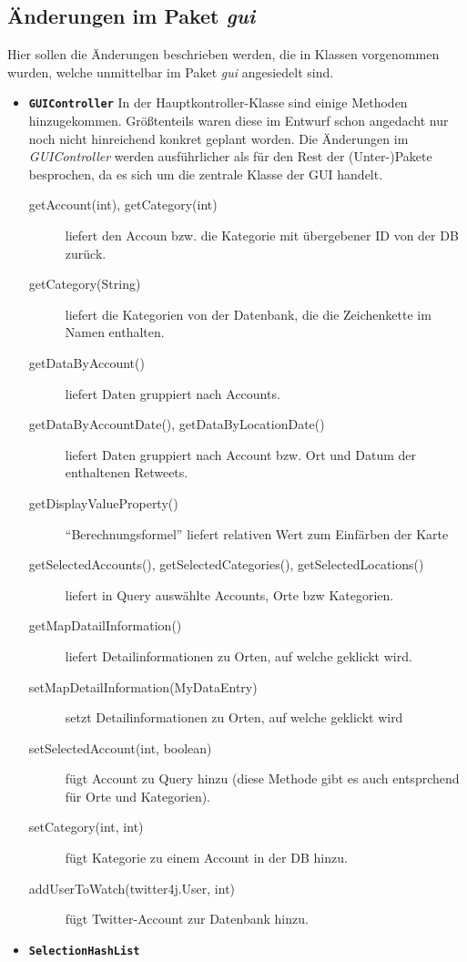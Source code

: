 \subsection{Änderungen im Paket \emph{gui}}
Hier sollen die Änderungen beschrieben werden, die in Klassen vorgenommen wurden, welche unmittelbar im Paket \emph{gui} angesiedelt sind.
\begin{itemize}
	\item \textbf{\lstinline{GUIController}}
	\quad 
	In der Hauptkontroller-Klasse sind einige Methoden hinzugekommen. Größtenteils waren diese im Entwurf schon angedacht nur noch nicht hinreichend konkret geplant worden. Die Änderungen im \emph{GUIController} werden ausführlicher als für den Rest der (Unter-)Pakete besprochen, da es sich um die zentrale Klasse der GUI handelt.
	\begin{description}
		\item[getAccount(int), getCategory(int)] liefert den Accoun bzw. die Kategorie mit übergebener ID von der DB zurück.
		\item[getCategory(String)] liefert die Kategorien von der Datenbank, die die Zeichenkette im Namen enthalten.
		\item[getDataByAccount()] liefert Daten gruppiert nach Accounts.
		\item[getDataByAccountDate(), getDataByLocationDate()] liefert Daten gruppiert nach Account bzw. Ort und Datum der enthaltenen Retweets.
		\item[getDisplayValueProperty()] "`Berechnungsformel"' liefert relativen Wert zum Einfärben der Karte
		\item[getSelectedAccounts(), getSelectedCategories(), getSelectedLocations()] liefert in Query auswählte Accounts, Orte bzw Kategorien.
		\item[getMapDatailInformation()] liefert Detailinformationen zu Orten, auf welche geklickt wird.
		\item[setMapDetailInformation(MyDataEntry)] setzt Detailinformationen zu Orten, auf welche geklickt wird
		\item[setSelectedAccount(int, boolean)] fügt Account zu Query hinzu (diese Methode gibt es auch entsprchend für Orte und Kategorien).
		\item[setCategory(int, int)] fügt Kategorie zu einem Account in der DB hinzu.
		\item[addUserToWatch(twitter4j.User, int)] fügt Twitter-Account zur Datenbank hinzu.
	\end{description}
	\item \textbf{\lstinline{SelectionHashList}}\quad

\end{itemize}
